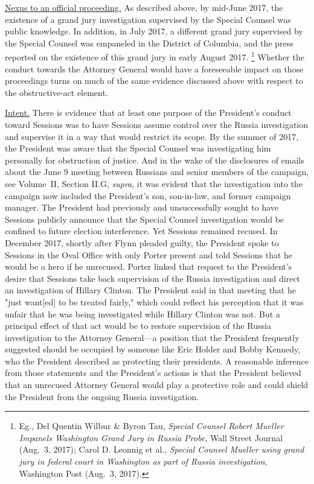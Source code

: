 {\underline{Nexus to an official proceeding.}
As described above, by mid-June 2017, the existence of a grand jury investigation supervised by the Special Counsel was public knowledge.
In addition, in July 2017, a different grand jury supervised by the Special Counsel was empaneled in the District of Columbia, and the press reported on the existence of this grand jury in early August 2017.%
\footnote{Eg., Del Quentin Wilbur \& Byron Tau, \textit{Special Counsel Robert Mueller Impanels Washington Grand Jury in Russia Probe}, Wall Street Journal (Aug.~3, 2017);
Carol D. Leonnig et al., \textit{Special Counsel Mueller using grand jury in federal court in Washington as part of Russia investigation}, Washington Post (Aug.~3, 2017).}
Whether the conduct towards the Attorney General would have a foreseeable impact on those proceedings turns on much of the same evidence discussed above with respect to the obstructive-act element.

\underline{Intent.}
There is evidence that at least one purpose of the President's conduct toward Sessions was to have Sessions assume control over the Russia investigation and supervise it in a way that would restrict its scope.
By the summer of 2017, the President was aware that the Special Counsel was investigating him personally for obstruction of justice.
And in the wake of the disclosures of emails about the June 9 meeting between Russians and senior members of the campaign, see Volume~II, Section II.G, \textit{supra}, it was evident that the investigation into the campaign now included the President's son, son-in-law, and former campaign manager.
The President had previously and unsuccessfully sought to have Sessions publicly announce that the Special Counsel investigation would be confined to future election interference.
Yet Sessions remained recused.
In December 2017, shortly after Flynn pleaded guilty, the President spoke to Sessions in the Oval Office with only Porter present and told Sessions that he would be a hero if he unrecused.
Porter linked that request to the President's desire that Sessions take back supervision of the Russia investigation and direct an investigation of Hillary Clinton.
The President said in that meeting that he "just want[ed] to be treated fairly," which could reflect his perception that it was unfair that he was being investigated while Hillary Clinton was not.
But a principal effect of that act would be to restore supervision of the Russia investigation to the
Attorney General---a position that the President frequently suggested should be occupied by someone like Eric Holder and Bobby Kennedy, who the President described as protecting their presidents.
A reasonable inference from those statements and the President's actions is that the President believed that an unrecused Attorney General would play a protective role and could shield the President from the ongoing Russia investigation.

}
